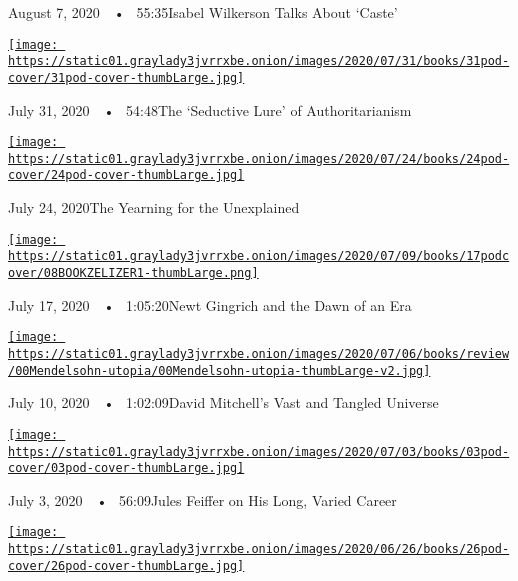 August 7, 2020~~•~ 55:35Isabel Wilkerson Talks About `Caste'

\href{https://www.nytimes3xbfgragh.onion/2020/07/31/books/review/podcast-twilight-democracy-anne-applebaum-eat-buddha-barbara-demick.html?action=click\&module=audio-series-bar\&region=header\&pgtype=Article}{\texttt{[image: https://static01.graylady3jvrrxbe.onion/images/2020/07/31/books/31pod-cover/31pod-cover-thumbLarge.jpg]}}

July 31, 2020~~•~ 54:48The `Seductive Lure' of Authoritarianism

\href{https://www.nytimes3xbfgragh.onion/2020/07/24/books/review/podcast-colin-dickey-unexplained-miles-harvey-king-of-confidence.html?action=click\&module=audio-series-bar\&region=header\&pgtype=Article}{\texttt{[image: https://static01.graylady3jvrrxbe.onion/images/2020/07/24/books/24pod-cover/24pod-cover-thumbLarge.jpg]}}

July 24, 2020The Yearning for the Unexplained

\href{https://www.nytimes3xbfgragh.onion/2020/07/17/books/review/podcast-julian-zelizer-burning-down-house-newt-gingrich-notes-silencing-lacy-crawford.html?action=click\&module=audio-series-bar\&region=header\&pgtype=Article}{\texttt{[image: https://static01.graylady3jvrrxbe.onion/images/2020/07/09/books/17podcover/08BOOKZELIZER1-thumbLarge.png]}}

July 17, 2020~~•~ 1:05:20Newt Gingrich and the Dawn of an Era

\href{https://www.nytimes3xbfgragh.onion/2020/07/10/books/review/david-mitchell-utopia-avenue-daniel-mendelsohn-biggest-bluff-poker-maria-konnikova.html?action=click\&module=audio-series-bar\&region=header\&pgtype=Article}{\texttt{[image: https://static01.graylady3jvrrxbe.onion/images/2020/07/06/books/review/00Mendelsohn-utopia/00Mendelsohn-utopia-thumbLarge-v2.jpg]}}

July 10, 2020~~•~ 1:02:09David Mitchell's Vast and Tangled Universe

\href{https://www.nytimes3xbfgragh.onion/2020/07/03/books/review/podcast-jules-feiffer-smart-george-steve-inskeep-imperfect-union.html?action=click\&module=audio-series-bar\&region=header\&pgtype=Article}{\texttt{[image: https://static01.graylady3jvrrxbe.onion/images/2020/07/03/books/03pod-cover/03pod-cover-thumbLarge.jpg]}}

July 3, 2020~~•~ 56:09Jules Feiffer on His Long, Varied Career

\href{https://www.nytimes3xbfgragh.onion/2020/06/26/books/review/podcast-richard-haass-world-brief-introduction.html?action=click\&module=audio-series-bar\&region=header\&pgtype=Article}{\texttt{[image: https://static01.graylady3jvrrxbe.onion/images/2020/06/26/books/26pod-cover/26pod-cover-thumbLarge.jpg]}}

